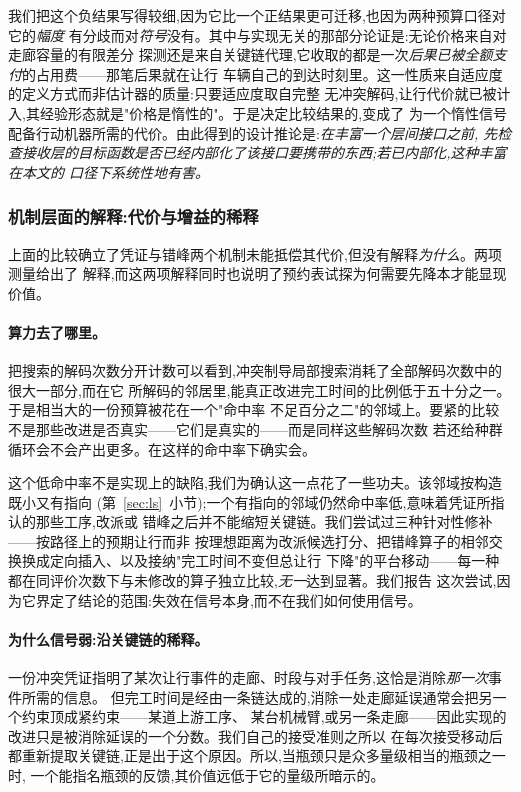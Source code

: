 \documentclass[manuscript,screen,review]{acmart}
\begin{document}
我们把这个负结果写得较细,因为它比一个正结果更可迁移,也因为两种预算口径对它的\emph{幅度}
有分歧而对\emph{符号}没有。其中与实现无关的那部分论证是:无论价格来自对走廊容量的有限差分
探测还是来自关键链代理,它收取的都是一次\emph{后果已被全额支付}的占用费——那笔后果就在让行
车辆自己的到达时刻里。这一性质来自适应度的定义方式而非估计器的质量:只要适应度取自完整
无冲突解码,让行代价就已被计入,其经验形态就是"价格是惰性的"。于是决定比较结果的,变成了
为一个惰性信号配备行动机器所需的代价。由此得到的设计推论是:\emph{在丰富一个层间接口之前,
先检查接收层的目标函数是否已经内部化了该接口要携带的东西;若已内部化,这种丰富在本文的
口径下系统性地有害。}

\subsubsection{机制层面的解释:代价与增益的稀释}
\label{sec:whycost}

上面的比较确立了凭证与错峰两个机制未能抵偿其代价,但没有解释\emph{为什么}。两项测量给出了
解释,而这两项解释同时也说明了预约表试探为何需要先降本才能显现价值。

\paragraph{算力去了哪里。}
把搜索的解码次数分开计数可以看到,冲突制导局部搜索消耗了全部解码次数中的很大一部分,而在它
所解码的邻居里,能真正改进完工时间的比例低于五十分之一。于是相当大的一份预算被花在一个"命中率
不足百分之二"的邻域上。要紧的比较不是那些改进是否真实——它们是真实的——而是同样这些解码次数
若还给种群循环会不会产出更多。在这样的命中率下确实会。

这个低命中率不是实现上的缺陷,我们为确认这一点花了一些功夫。该邻域按构造既小又有指向
(第~\ref{sec:ls}~小节);一个有指向的邻域仍然命中率低,意味着凭证所指认的那些工序,改派或
错峰之后并不能缩短关键链。我们尝试过三种针对性修补——按路径上的预期让行而非
按理想距离为改派候选打分、把错峰算子的相邻交换换成定向插入、以及接纳"完工时间不变但总让行
下降"的平台移动——每一种都在同评价次数下与未修改的算子独立比较,\emph{无一}达到显著。我们报告
这次尝试,因为它界定了结论的范围:失效在信号本身,而不在我们如何使用信号。

\paragraph{为什么信号弱:沿关键链的稀释。}
一份冲突凭证指明了某次让行事件的走廊、时段与对手任务,这恰是消除\emph{那一次}事件所需的信息。
但完工时间是经由一条链达成的,消除一处走廊延误通常会把另一个约束顶成紧约束——某道上游工序、
某台机械臂,或另一条走廊——因此实现的改进只是被消除延误的一个分数。我们自己的接受准则之所以
在每次接受移动后都重新提取关键链,正是出于这个原因。所以,当瓶颈只是众多量级相当的瓶颈之一时,
一个能指名瓶颈的反馈,其价值远低于它的量级所暗示的。
\end{document}
